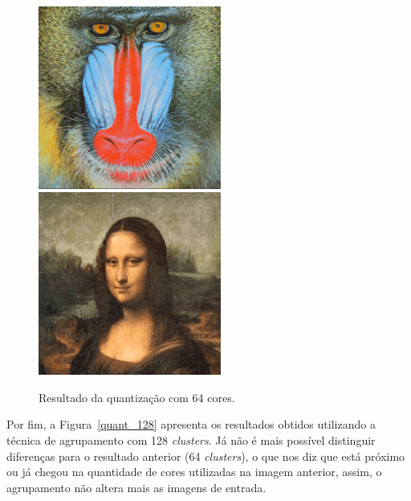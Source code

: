 \documentclass[twoside,twocolumn]{article}
\begin{document}
\begin{figure}[h]
\begin{center}
	\includegraphics[height=6cm]{figures/baboon_64.png} \quad
	\includegraphics[height=6cm]{figures/monalisa_64.png}
\caption{Resultado da quantização com 64 cores.} \label{quant_64}
\end{center}
\end{figure}

Por fim, a Figura~\ref{quant_128} apresenta os resultados obtidos utilizando a técnica de agrupamento com 128 \textit{clusters}. Já não é mais possível distinguir diferenças para o resultado anterior (64 \textit{clusters}), o que nos diz que está próximo ou já chegou na quantidade de cores utilizadas na imagem anterior, assim, o agrupamento não altera mais as imagens de entrada.
\end{document}

